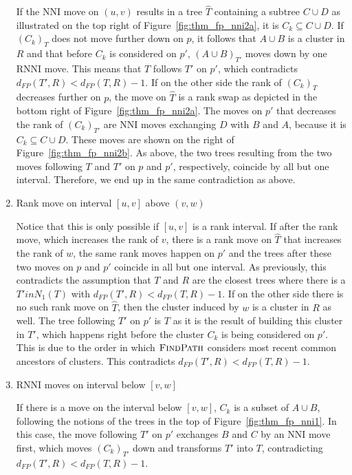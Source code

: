 \documentclass{amsart}
\newcommand{\rnni}{\mathrm{RNNI}}
\newcommand{\findpath}{\textsc{FindPath}}
\newcommand{\nni}{\mathrm{NNI}}
\begin{document}
\begin{enumerate}
    If the $\nni$ move on $(u,v)$ results in a tree $\hat T$ containing a subtree $C \cup D$ as illustrated on the top right of Figure~\ref{fig:thm_fp_nni2a}, it is $C_k \subseteq C \cup D$.
    If $(C_k)_T$ does not move further down on $p$, it follows that $A \cup B$ is a cluster in $R$ and that before $C_k$ is considered on $p'$, $(A \cup B)_{T'}$ moves down by one $\rnni$ move.
    This means that $T$ follows $T'$ on $p'$, which contradicts $d_{FP}(T',R) < d_{FP}(T,R) - 1$.
    If on the other side the rank of $(C_k)_T$ decreases further on $p$, the move on $\hat T$ is a rank swap as depicted in the bottom right of Figure~\ref{fig:thm_fp_nni2a}.
    The moves on $p'$ that decreases the rank of $(C_k)_{T'}$ are $\nni$ moves exchanging $D$ with $B$ and $A$, because it is $C_k \subseteq C \cup D$.
    These moves are shown on the right of Figure~\ref{fig:thm_fp_nni2b}.
    As above, the two trees resulting from the two moves following $T$ and $T'$ on $p$ and $p'$, respectively, coincide by all but one interval.
    Therefore, we end up in the same contradiction as above.

    \item Rank move on interval $[u,v]$ above $(v,w)$

    Notice that this is only possible if $[u,v]$ is a rank interval.
    If after the rank move, which increases the rank of $v$, there is a rank move on $\hat T$ that increases the rank of $w$, the same rank moves happen on $p'$ and the trees after these two moves on $p$ and $p'$ coincide in all but one interval.
    As previously, this contradicts the assumption that $T$ and $R$ are the closest trees where there is a $T' in N_1(T)$ with $d_{FP}(T',R) < d_{FP}(T,R) - 1$.
    If on the other side there is no such rank move on $\hat T$, then the cluster induced by $w$ is a cluster in $R$ as well.
    The tree following $T'$ on $p'$ is $T$ as it is the result of building this cluster in $T'$, which happens right before the cluster $C_k$ is being considered on $p'$.
    This is due to the order in which $\findpath$ considers most recent common ancestors of clusters.
    This contradicts $d_{FP}(T',R) < d_{FP}(T,R) - 1$.

    \item $\rnni$ moves on interval below $[v,w]$

    If there is a move on the interval below $[v,w]$, $C_k$ is a subset of $A \cup B$, following the notions of the trees in the top of Figure~\ref{fig:thm_fp_nni1}.
    In this case, the move following $T'$ on $p'$ exchanges $B$ and $C$ by an $\nni$ move first, which moves $(C_k)_{T'}$ down and transforms $T'$ into $T$, contradicting $d_{FP}(T',R) < d_{FP}(T,R) - 1$.
\end{enumerate}
\end{document}
